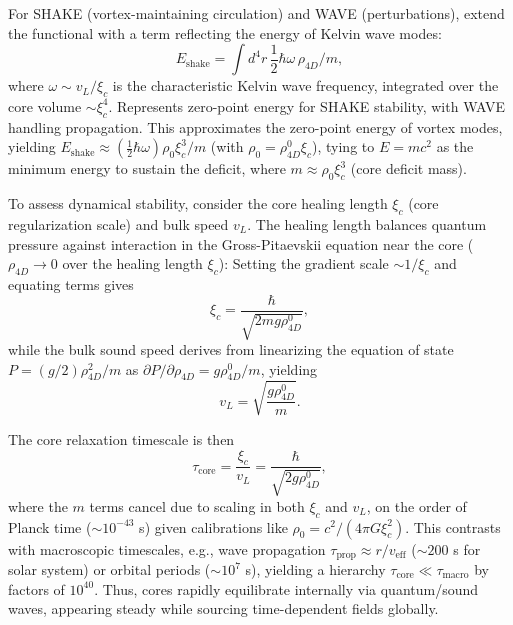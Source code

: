 For SHAKE (vortex-maintaining circulation) and WAVE (perturbations), extend the functional with a term reflecting the energy of Kelvin wave modes:
\begin{equation}
E_{\text{shake}} = \int d^4 r \, \frac{1}{2} \hbar \omega \, \rho_{4D} / m,
\end{equation}
where $\omega \sim v_L / \xi_c$ is the characteristic Kelvin wave frequency, integrated over the core volume $\sim \xi_c^4$. Represents zero-point energy for SHAKE stability, with WAVE handling propagation. This approximates the zero-point energy of vortex modes, yielding $E_{\text{shake}} \approx (\frac{1}{2} \hbar \omega) \rho_0 \xi_c^3 / m$ (with $\rho_0 = \rho_{4D}^0 \xi_c$), tying to $E = m c^2$ as the minimum energy to sustain the deficit, where $m \approx \rho_0 \xi_c^3$ (core deficit mass).

To assess dynamical stability, consider the core healing length $\xi_c$ (core regularization scale) and bulk speed $v_L$. The healing length balances quantum pressure against interaction in the Gross-Pitaevskii equation near the core ($\rho_{4D} \to 0$ over the healing length $\xi_c$): Setting the gradient scale $\sim 1/\xi_c$ and equating terms gives
\begin{equation}
\xi_c = \frac{\hbar}{\sqrt{2 m g \rho_{4D}^0}},
\end{equation}
while the bulk sound speed derives from linearizing the equation of state $P = (g/2) \rho_{4D}^2 / m$ as $\partial P / \partial \rho_{4D} = g \rho_{4D}^0 / m$, yielding
\begin{equation}
v_L = \sqrt{\frac{g \rho_{4D}^0}{m}}.
\end{equation}

The core relaxation timescale is then
\begin{equation}
\tau_{\text{core}} = \frac{\xi_c}{v_L} = \frac{\hbar}{\sqrt{2 g \rho_{4D}^0}},
\end{equation}
where the $m$ terms cancel due to scaling in both $\xi_c$ and $v_L$, on the order of Planck time ($\sim 10^{-43}$ s) given calibrations like $\rho_0 = c^2 / (4\pi G \xi_c^2)$. This contrasts with macroscopic timescales, e.g., wave propagation $\tau_{\text{prop}} \approx r / v_{\text{eff}}$ ($\sim 200$ s for solar system) or orbital periods ($\sim 10^7$ s), yielding a hierarchy $\tau_{\text{core}} \ll \tau_{\text{macro}}$ by factors of $10^{40}$. Thus, cores rapidly equilibrate internally via quantum/sound waves, appearing steady while sourcing time-dependent fields globally.

